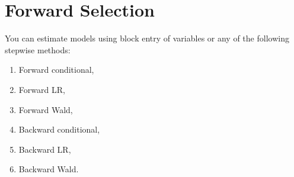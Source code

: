 \documentclass[a4paper,12pt]{article}
\begin{document}
\newpage
\section*{Forward Selection}
You can estimate models using block entry of variables or any of the following stepwise
methods: 
\begin{multicols}{2}

	\begin{enumerate}
		\item Forward conditional,
		\item Forward LR,
		\item Forward Wald, 
		\item Backward conditional, 
		\item Backward LR, 
		\item Backward Wald.
	\end{enumerate}
\end{multicols}
\end{document}
